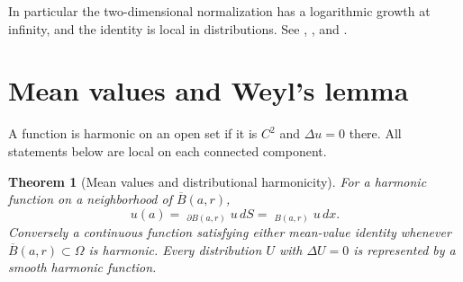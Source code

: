 \documentclass[11pt,oneside,openany]{book}
\newcommand{\dashint}{\mathop{\overline{\int}}\nolimits}
\theoremstyle{plain}
\newtheorem{theorem}{Theorem}[chapter]
\theoremstyle{definition}
\theoremstyle{remark}
\begin{document}
In particular the two-dimensional normalization has a logarithmic
growth at infinity, and the identity is local in distributions.
See \cite[Section 2.2.1]{Evans}, \cite[Section 4.1]{GT},
and \cite[Section 4.3]{AG}.

\section{Mean values and Weyl's lemma}
\label{pde:L02}

A function is harmonic on an open set if it is \(C^2\) and
\(\Delta u=0\) there. All statements below are local on each
connected component.

\begin{theorem}[Mean values and distributional harmonicity]
\label{thm:pde-mean-weyl}
For a harmonic function on a neighborhood of
\(\overline B(a,r)\),
\[
 u(a)=\dashint_{\partial B(a,r)}u\,dS
     =\dashint_{B(a,r)}u\,dx .
\]
Conversely a continuous function satisfying either mean-value
identity whenever \(\overline B(a,r)\subset\Omega\) is harmonic.
Every distribution \(U\) with \(\Delta U=0\) is represented
by a smooth harmonic function.
\end{theorem}
\end{document}
